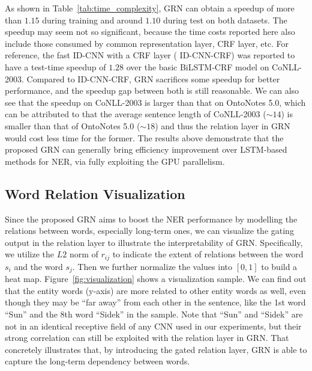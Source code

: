 \documentclass[letterpaper]{article} \usepackage{aaai19}  \usepackage{times}  \usepackage{helvet}  \usepackage{courier}  \usepackage{url}  \usepackage{graphicx}  \usepackage{amsmath}
\newcommand{\ie}{\text{i.e.,}}
\newcommand{\GRN}{GRN}
\begin{document}
As shown in Table~\ref{tab:time_complexity}, \GRN{} can obtain a speedup of more than $1.15$ during training and around $1.10$ during test on both datasets. The speedup may seem not so significant, because the time costs reported here also include those consumed by common representation layer, CRF layer, etc. For reference, the fast ID-CNN with a CRF layer (\ie{} ID-CNN-CRF) \cite{strubell2017fast} was reported to have a test-time speedup of $1.28$ over the basic BiLSTM-CRF model on CoNLL-2003. Compared to ID-CNN-CRF, \GRN{} sacrifices some speedup for better performance, and the speedup gap between both is still reasonable. We can also see that the speedup on CoNLL-2003 is larger than that on OntoNotes 5.0, which can be attributed to that the average sentence length of CoNLL-2003 ($\sim 14$) is smaller than that of OntoNotes 5.0 ($\sim 18$) and thus the relation layer in \GRN{} would cost less time for the former.
The results above demonstrate that the proposed \GRN{} can generally bring efficiency improvement over LSTM-based methods for NER, via fully exploiting the GPU parallelism.

\begin{table}[t!]
  \centering
    \begin{adjustbox}{width=0.75\columnwidth}
    \end{adjustbox}
    \caption{Training/test speedup of \GRN{} compared with CNN-BiLSTM-CRF. }\label{tab:time_complexity}
\end{table}

\subsection{Word Relation Visualization}
Since the proposed \GRN{} aims to boost the NER performance by modelling the relations between words, especially long-term ones, we can visualize the gating output in the relation layer to illustrate the interpretability of \GRN{}. Specifically, we utilize the $L2$ norm of $r_{ij}$ to indicate the extent of relations between the word $s_i$ and the word $s_j$. Then we further normalize the values into $\left[0, 1\right]$ to build a heat map. Figure~\ref{fig:visualization} shows a visualization sample. We can find out that the entity words (y-axis) are more related to other entity words as well, even though they may be ``far away'' from each other in the sentence, like the 1st word ``Sun'' and the 8th word ``Sidek'' in the sample. Note that ``Sun'' and ``Sidek'' are not in an identical receptive field of any CNN used in our experiments, but their strong correlation can still be exploited with the relation layer in \GRN{}. That concretely illustrates that, by introducing the gated relation layer, \GRN{} is able to capture the long-term dependency between words. 
\end{document}
